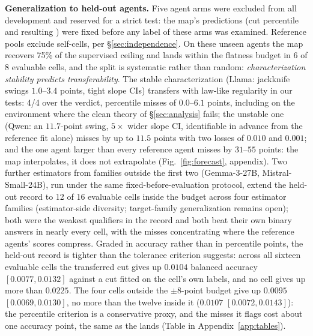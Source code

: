 \documentclass{article}
\newcommand{\ba}{\text{BA}}
\begin{document}
\textbf{Generalization to held-out agents.} Five agent arms were excluded
from all development and reserved for a strict test: the map's predictions
(cut percentile and resulting \ba) were fixed before any label of these arms
was examined. Reference pools exclude self-cells, per
\S\ref{sec:independence}. On these unseen agents the map recovers 75\% of the
supervised ceiling and lands within the flatness budget in 6 of 8 evaluable
cells, and the split is systematic rather than random:
\emph{characterization stability predicts transferability}. The
stable characterization (Llama: jackknife swings $1.0$--$3.4$ points, tight
slope CIs) transfers with law-like regularity in our tests: 4/4 over the
verdict, percentile misses of
$0.0$--$6.1$ points, including on the environment where the clean theory of
\S\ref{sec:analysis} fails; the unstable one (Qwen: an $11.7$-point swing,
$5\times$ wider slope CI, identifiable in advance from the reference fit
alone) misses by up to
$11.5$ points with two losses of $0.010$ and $0.001$; and the one agent larger
than every reference agent misses by $31$--$55$ points: the map
interpolates, it does not extrapolate (Fig.~\ref{fig:forecast}, appendix).
Two further estimators from families outside the first two
(Gemma-3-27B, Mistral-Small-24B), run under the same fixed-before-evaluation
protocol, extend the held-out record to 12 of 16 evaluable cells inside the
budget across four estimator families (estimator-side diversity; target-family generalization remains open); both were the weakest qualifiers in
the record and both beat their own binary answers in nearly every cell, with
the misses concentrating where the reference agents' scores compress.
Graded in accuracy rather than in percentile points, the held-out record is
tighter than the tolerance criterion suggests: across all sixteen evaluable
cells the transferred cut gives up $0.0104$ balanced accuracy
$[0.0077, 0.0132]$ against a cut fitted on the cell's own labels, and no cell
gives up more than $0.0225$. The four cells outside the $\pm 8$-point budget
give up $0.0095$ $[0.0069, 0.0130]$, no more than the twelve inside it
($0.0107$ $[0.0072, 0.0143]$): the percentile criterion is a conservative
proxy, and the misses it flags cost about one accuracy point, the same as the
lands (Table in Appendix~\ref{app:tables}).
\end{document}
